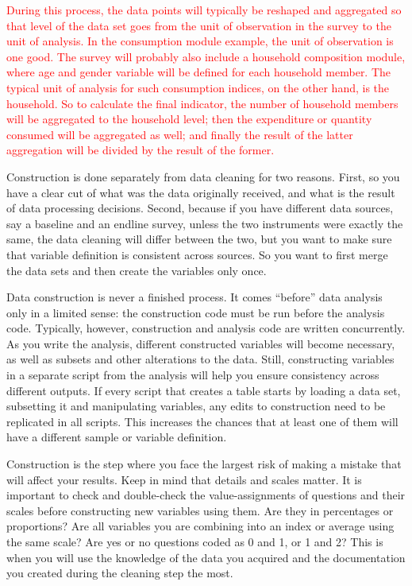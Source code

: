 \textcolor{red}{During this process, the data points will typically be reshaped and aggregated 
so that level of the data set goes from the unit of observation in the survey to the unit of analysis. 
In the consumption module example, the unit of observation is one good. 
The survey will probably also include a household composition module,
where age and gender variable will be defined for each household member.
The typical unit of analysis for such consumption indices, on the other hand, is the household.
So to calculate the final indicator, 
the number of household members will be aggregated to the household level;
then the expenditure or quantity consumed will be aggregated as well;
and finally the result of the latter aggregation will be divided by the result of the former.}


Construction is done separately from data cleaning for two reasons. 
First, so you have a clear cut of what was the data originally received,
and what is the result of data processing decisions.
Second, because if you have different data sources, 
say a baseline and an endline survey, 
unless the two instruments were exactly the same, 
the data cleaning will differ between the two,
but you want to make sure that variable definition is consistent across sources. 
So you want to first merge the data sets and then create the variables only once.

Data construction is never a finished process.
It comes ``before'' data analysis only in a limited sense: the construction code must be run before the analysis code.
Typically, however, construction and analysis code are written concurrently.
As you write the analysis, different constructed variables will become necessary, as well as subsets and other alterations to the data.
Still, constructing variables in a separate script from the analysis will help you ensure consistency across different outputs. 
If every script that creates a table starts by loading a data set, subsetting it and manipulating variables, any edits to construction need to be replicated in all scripts. 
This increases the chances that at least one of them will have a different sample or variable definition.


Construction is the step where you face the largest risk of making a mistake that will affect your results. 
Keep in mind that details and scales matter. 
It is important to check and double-check the value-assignments of questions and their scales before constructing new variables using them. 
Are they in percentages or proportions? 
Are all variables you are combining into an index or average using the same scale? 
Are yes or no questions coded as 0 and 1, or 1 and 2?
This is when you will use the knowledge of the data you acquired and the documentation you created during the cleaning step the most.

